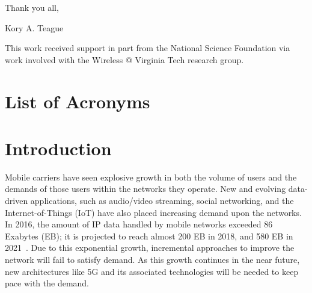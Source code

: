 \documentclass[12pt,dvipsnames]{report}
\begin{document}
\vfill

\noindent Thank you all,

Kory A. Teague

\vfill

This work received support in part from the National Science Foundation via work involved with the Wireless @ Virginia Tech research group.

\pagebreak

\tableofcontents
\pagebreak

\listoffigures
\pagebreak

\listoftables
\pagebreak

\chapter*{List of Acronyms}
\begin{acronym}
\end{acronym}

\pagestyle{myheadings}

\chapter{Introduction} \label{ch:intro}

Mobile carriers have seen explosive growth in both the volume of users and the demands of those users within the networks they operate.  New and evolving data-driven applications, such as audio/video streaming, social networking, and the Internet-of-Things (IoT) have also placed increasing demand upon the networks.  In 2016, the amount of IP data handled by mobile networks exceeded 86 Exabytes (EB); it is projected to reach almost 200 EB in 2018, and 580 EB in 2021~\cite{ciscoVNI2017}.  Due to this exponential growth, incremental approaches to improve the network will fail to satisfy demand.  As this growth continues in the near future, new architectures like 5G and its associated technologies will be needed to keep pace with the demand.
\end{document}
